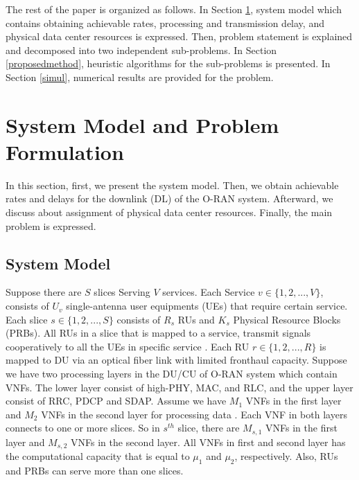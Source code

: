 \documentclass[conference]{IEEEtran}
\begin{document}
The rest of the paper is organized as follows. In Section \ref{systemmodel}, system model which contains obtaining achievable rates, processing and transmission delay, and physical data center resources is expressed. Then, problem statement is explained and decomposed into two independent sub-problems.
In Section \ref{proposedmethod}, heuristic algorithms for the sub-problems is presented. In Section \ref{simul}, numerical results are provided for the problem.


\section{System Model and Problem Formulation}\label{systemmodel}
In this section, first, we  present the system model. Then, we obtain achievable rates and delays for the downlink (DL) of the O-RAN system. Afterward, we discuss about assignment of physical data center resources.
Finally, the main problem is expressed.
\subsection{System Model}
Suppose there are $S$ slices Serving $V$ services. Each Service $v\in \{1,2,...,V \} $, consists of $U_v$
single-antenna user equipments (UEs) that require certain service. Each slice $s \in \{1,2,...,S \}$ consists of $R_s$ RUs and $K_s$ Physical Resource Blocks (PRBs). All RUs in a slice that is mapped to a service, transmit signals cooperatively to all the UEs in specific service \cite{motalleb2017optimal,mimoCran}. Each RU $r \in \{1,2,...,R \}$ is mapped to DU via an optical fiber link with limited fronthaul capacity.
Suppose we have two processing layers in the DU/CU of O-RAN system which contain VNFs. The lower layer consist of high-PHY, MAC, and RLC, and the upper layer consist of RRC, PDCP and SDAP.
Assume we have $M_1$ VNFs in the first layer and $M_2$ VNFs in the second layer for processing data .
Each VNF in both layers connects to one or more slices. So in $s^{th}$ slice, there are $M_{s,1}$ VNFs in the first layer and $M_{s,2}$ VNFs in the second layer. All VNFs in first and second layer has the computational capacity that is  equal to $\mu_1$ and $\mu_2$, respectively.
Also, RUs and PRBs can serve more than one slices.
\end{document}

